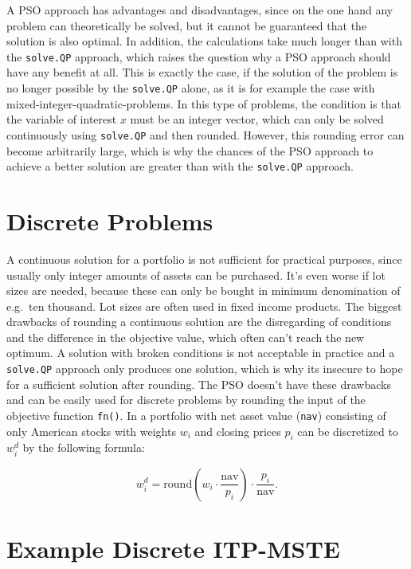 \documentclass[
  oneside, a4paper, 12pt, openany]{book}
\theoremstyle{definition}
\theoremstyle{definition}
\theoremstyle{definition}
\theoremstyle{definition}
\theoremstyle{remark}
\begin{document}
A PSO approach has advantages and disadvantages, since on the one hand any problem can theoretically be solved, but it cannot be guaranteed that the solution is also optimal. In addition, the calculations take much longer than with the \texttt{solve.QP} approach, which raises the question why a PSO approach should have any benefit at all. This is exactly the case, if the solution of the problem is no longer possible by the \texttt{solve.QP} alone, as it is for example the case with mixed-integer-quadratic-problems. In this type of problems, the condition is that the variable of interest \(x\) must be an integer vector, which can only be solved continuously using \texttt{solve.QP} and then rounded. However, this rounding error can become arbitrarily large, which is why the chances of the PSO approach to achieve a better solution are greater than with the \texttt{solve.QP} approach.

\hypertarget{discrete-problems}{%
\section{Discrete Problems}\label{discrete-problems}}

A continuous solution for a portfolio is not sufficient for practical purposes, since usually only integer amounts of assets can be purchased. It's even worse if lot sizes are needed, because these can only be bought in minimum denomination of e.g.~ten thousand. Lot sizes are often used in fixed income products. The biggest drawbacks of rounding a continuous solution are the disregarding of conditions and the difference in the objective value, which often can't reach the new optimum. A solution with broken conditions is not acceptable in practice and a \texttt{solve.QP} approach only produces one solution, which is why its insecure to hope for a sufficient solution after rounding. The PSO doesn't have these drawbacks and can be easily used for discrete problems by rounding the input of the objective function \texttt{fn()}. In a portfolio with net asset value (\texttt{nav}) consisting of only American stocks with weights \(w_i\) and closing prices \(p_i\) can be discretized to \(w_i^d\) by the following formula:

\[
  w_i^d =\text{round}(w_i \cdot \frac{\text{nav}}{p_i})\cdot \frac{p_i}{\text{nav}}.
\]

\hypertarget{example-discrete-itp-mste}{%
\section{Example Discrete ITP-MSTE}\label{example-discrete-itp-mste}}
\end{document}
